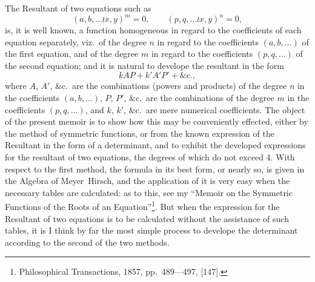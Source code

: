 \documentclass[11pt,a4paper]{book}
\begin{document}
\begin{center}
\normalsize

The Resultant of two equations such as
\[
(a, b, \ldots \wr x, y)^m = 0,
\qquad
(p, q, \ldots \wr x, y)^n = 0,
\]
is, it is well known, a function homogeneous in regard to the coefficients of
each equation separately, viz.\ of the degree $n$ in regard to the
coefficients $(a, b, \ldots)$ of the first equation, and of the degree $m$
in regard to the coefficients $(p, q, \ldots)$ of the second equation; and it
is natural to develope the resultant in the form
\[
kAP + k'A'P' + \&\text{c.},
\]
where $A$, $A'$, \&c.\ are the combinations (powers and products) of the
degree $n$ in the coefficients $(a, b, \ldots)$, $P$, $P'$, \&c.\ are the
combinations of the degree $m$ in the coefficients $(p, q, \ldots)$, and $k$,
$k'$, \&c.\ are mere numerical coefficients. The object of the present memoir
is to show how this may be conveniently effected, either by the method of
symmetric functions, or from the known expression of the Resultant in the form
of a determinant, and to exhibit the developed expressions for the resultant of
two equations, the degrees of which do not exceed 4. With respect to the first
method, the formula in its best form, or nearly so, is given in the Algebra of
Meyer~Hirsch, and the application of it is very easy when the necessary tables
are calculated: as to this, see my ``Memoir on the Symmetric Functions of the
Roots of an Equation''\footnote{Philosophical Transactions, 1857,
pp.~489---497, [147].}. But when the expression for the Resultant of two
equations is to be calculated without the assistance of such tables, it is I
think by far the most simple process to develope the determinant according to
the second of the two methods.


\end{center}
\end{document}
